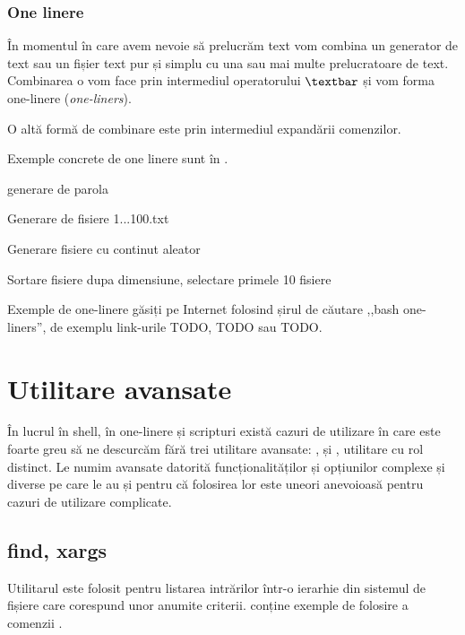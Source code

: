 \subsubsection{One linere}
\label{sec:cli-one-liners}

În momentul în care avem nevoie să prelucrăm text vom combina un generator de
text sau un fișier text pur și simplu cu una sau mai multe prelucratoare de
text. Combinarea o vom face prin intermediul operatorului \texttt{$\textbar$} și vom
forma one-linere (\textit{one-liners}).

O altă formă de combinare este prin intermediul expandării comenzilor.

Exemple concrete de one linere sunt în .

\begin{screen}[caption={Exemple de one-linere},label={lst:sec:one-liners}]
generare de parola

Generare de fisiere 1...100.txt

Generare fisiere cu continut aleator

Sortare fisiere dupa dimensiune, selectare primele 10 fisiere
\end{screen}

Exemple de one-linere găsiți pe Internet folosind șirul de căutare ,,bash one-liners'', de exemplu link-urile TODO, TODO sau TODO.

\section{Utilitare avansate}
\label{sec:cli-advanced-utils}

În lucrul în shell, în one-linere și scripturi există cazuri de utilizare în
care este foarte greu să ne descurcăm fără trei utilitare avansate: ,  și
, utilitare cu rol distinct. Le numim avansate datorită funcționalităților și
opțiunilor complexe și diverse pe care le au și pentru că folosirea lor este
uneori anevoioasă pentru cazuri de utilizare complicate.

\subsection{find, xargs}
\label{sec:cli-find-xargs}

Utilitarul  este folosit pentru listarea intrărilor într-o ierarhie din
sistemul de fișiere care corespund unor anumite criterii.  conține exemple de folosire a comenzii .

